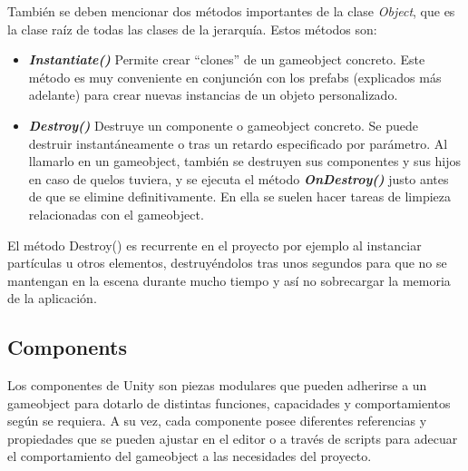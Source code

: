 También se deben mencionar dos métodos importantes de la clase \textit{Object}, que es la clase raíz de todas las clases de la jerarquía. Estos métodos son:
\begin{itemize}
\tightlist
	\item \textbf{\textit{Instantiate()}} \cite{doc:Instantiate} Permite crear ``clones'' de un gameobject concreto. Este método es muy conveniente en conjunción con los prefabs (explicados más adelante) para crear nuevas instancias de un objeto personalizado.
	\item \textbf{\textit{Destroy()}} \cite{doc:Destroy} Destruye un componente o gameobject concreto. Se puede destruir instantáneamente o tras un retardo especificado por parámetro. Al llamarlo en un gameobject, también se destruyen sus componentes y sus hijos en caso de quelos tuviera, y se ejecuta el método \textbf{\textit{OnDestroy()}} \cite{doc:OnDestroy} justo antes de que se elimine definitivamente. En ella se suelen hacer tareas de limpieza relacionadas con el gameobject.
\end{itemize}	
El método Destroy() es recurrente en el proyecto por ejemplo al instanciar partículas u otros elementos, destruyéndolos tras unos segundos para que no se mantengan en la escena durante mucho tiempo y así no sobrecargar la memoria de la aplicación.
\subsection{Components}
Los componentes de Unity \cite{doc:Components} son piezas modulares que pueden adherirse a un gameobject para dotarlo de distintas funciones, capacidades y comportamientos según se requiera. A su vez, cada componente posee diferentes referencias y propiedades que se pueden ajustar en el editor o a través de scripts para adecuar el comportamiento del gameobject a las necesidades del proyecto.

